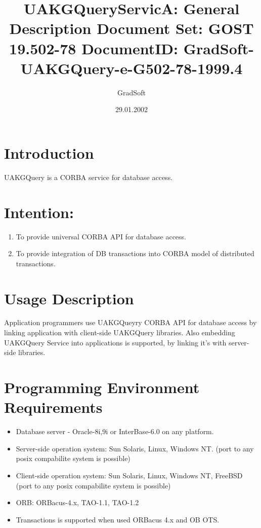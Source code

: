 \documentclass[12pt]{article}
\title{ 
  UAKGQueryServicA: General Description
  \newline
  {\small Document Set: GOST 19.502-78 }
  \newline
  {\small DocumentID: GradSoft-UAKGQuery-e-G502-78-1999.4 }
}
\date{29.01.2002}
\author{ GradSoft }
\begin{document}
\maketitle{}

\tableofcontents

\section{  Introduction }

  UAKGQuery is a CORBA service for database access.

\section{ Intention:}

 \begin{enumerate}
   \item To provide universal CORBA API for database access.
   \item To provide integration of DB transactions into CORBA model of
 distributed transactions. 
 \end{enumerate}

\section{ Usage Description  }

  Application programmers use UAKGQueyry CORBA API for database access
 by linking application with client-side UAKGQuery libraries.
 Also embedding UAKGQuery Service into applications is supported, by linking
 it's with server-side libraries.

\section{Programming Environment Requirements}

 \begin{itemize}
  \item Database server - Oracle-8i,9i or InterBase-6.0 on any platform.
  \item Server-side operation system: Sun Solaris, Linux, Windows NT. 
  (port to any posix compabilite system is possible)
  \item Client-side operation system: Sun Solaris, Linux, Windows NT, FreeBSD 
  (port to any posix compabilite system is possible)
  \item ORB: ORBacus-4.x, TAO-1.1, TAO-1.2
  \item Transactions is supported when used ORBacus 4.x and OB OTS.
 \end{itemize}
\end{document}
